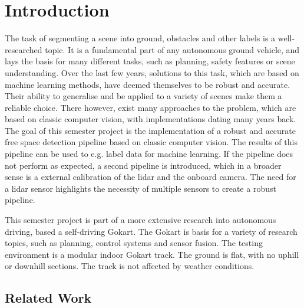 
\chapter{Introduction}
\label{chp:Introduction}


The task of segmenting a scene into ground, obstacles and other labels is a well-researched topic. It is a fundamental part of any autonomous ground vehicle, and lays the basis for many different tasks, such as planning, safety features or scene understanding. Over the last few years, solutions to this task, which are based on machine learning methods, have deemed themselves to be robust and accurate. Their ability to generalise and be applied to a variety of scenes make them a reliable choice. There however, exist many approaches to the problem, which are based on classic computer vision, with implementations dating many years back. \newline
The goal of this semester project is the implementation of a robust and accurate free space detection pipeline based on classic computer vision. The results of this pipeline can be used to e.g. label data for machine learning. If the pipeline does not perform as expected, a second pipeline is introduced, which in a broader sense is a external calibration of the lidar and the onboard camera. The need for a lidar sensor highlights the necessity of multiple sensors to create a robust pipeline.

This semester project is part of a more extensive research into autonomous driving, based a self-driving Gokart. The Gokart is basis for a variety of research topics, such as planning, control systems and sensor fusion. The testing environment is a modular indoor Gokart track. The ground is flat, with no uphill or downhill sections. The track is not affected by weather conditions. 
\newline


\section{Related Work}

